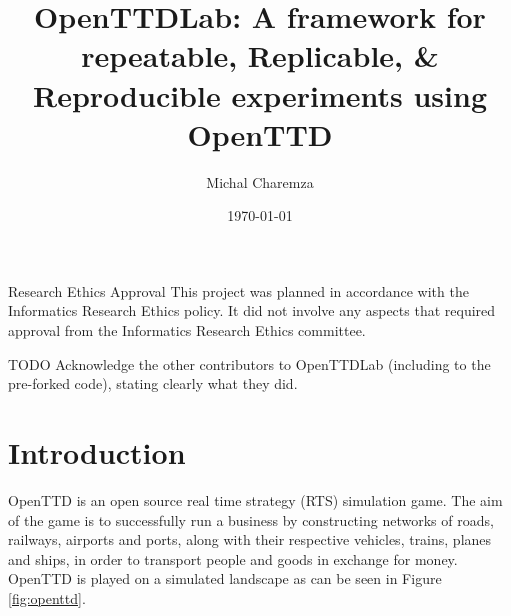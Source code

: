 \documentclass[logo,msc]{infthesis}           %
\begin{document}
\begin{preliminary}

\title{OpenTTDLab: A framework for repeatable, Replicable, \& Reproducible experiments using OpenTTD}

\author{Michal Charemza}

\date{\today}


\maketitle

\newenvironment{ethics}
   {\begin{frontenv}{Research Ethics Approval}{\LARGE}}
   {\end{frontenv}\newpage}

\begin{ethics}
This project was planned in accordance with the Informatics Research
Ethics policy. It did not involve any aspects that required approval
from the Informatics Research Ethics committee.

\standarddeclaration
\end{ethics}


\begin{acknowledgements}
TODO Acknowledge the other contributors to OpenTTDLab (including to the pre-forked code), stating clearly what they did.
\end{acknowledgements}


\tableofcontents
\end{preliminary}


\chapter{Introduction}

OpenTTD \cite{openttd} is an open source real time strategy (RTS) simulation game. The aim of the game is to successfully run a business by constructing networks of roads, railways, airports and ports, along with their respective vehicles, trains, planes and ships, in order to transport people and goods in exchange for money. OpenTTD is played on a simulated landscape as can be seen in Figure \ref{fig:openttd}.
\end{document}
